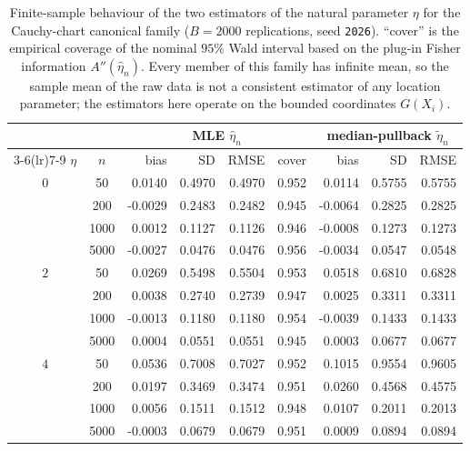 \documentclass[11pt]{article}
\theoremstyle{definition}
\begin{document}
\begin{table}[t]
\centering
\small
\begin{tabular}{cc rrrc rrr}
\toprule
& & \multicolumn{4}{c}{MLE $\hat\eta_n$}
  & \multicolumn{3}{c}{median-pullback $\tilde\eta_n$}\\
\cmidrule(lr){3-6}\cmidrule(lr){7-9}
$\eta$ & $n$ & bias & SD & RMSE & cover & bias & SD & RMSE\\
\midrule
$0$ & 50 & 0.0140 & 0.4970 & 0.4970 & 0.952 & 0.0114 & 0.5755 & 0.5755 \\
 & 200 & -0.0029 & 0.2483 & 0.2482 & 0.945 & -0.0064 & 0.2825 & 0.2825 \\
 & 1000 & 0.0012 & 0.1127 & 0.1126 & 0.946 & -0.0008 & 0.1273 & 0.1273 \\
 & 5000 & -0.0027 & 0.0476 & 0.0476 & 0.956 & -0.0034 & 0.0547 & 0.0548 \\
\addlinespace
$2$ & 50 & 0.0269 & 0.5498 & 0.5504 & 0.953 & 0.0518 & 0.6810 & 0.6828 \\
 & 200 & 0.0038 & 0.2740 & 0.2739 & 0.947 & 0.0025 & 0.3311 & 0.3311 \\
 & 1000 & -0.0013 & 0.1180 & 0.1180 & 0.954 & -0.0039 & 0.1433 & 0.1433 \\
 & 5000 & 0.0004 & 0.0551 & 0.0551 & 0.945 & 0.0003 & 0.0677 & 0.0677 \\
\addlinespace
$4$ & 50 & 0.0536 & 0.7008 & 0.7027 & 0.952 & 0.1015 & 0.9554 & 0.9605 \\
 & 200 & 0.0197 & 0.3469 & 0.3474 & 0.951 & 0.0260 & 0.4568 & 0.4575 \\
 & 1000 & 0.0056 & 0.1511 & 0.1512 & 0.948 & 0.0107 & 0.2011 & 0.2013 \\
 & 5000 & -0.0003 & 0.0679 & 0.0679 & 0.951 & 0.0009 & 0.0894 & 0.0894 \\
\bottomrule
\end{tabular}
\caption{Finite-sample behaviour of the two estimators of the natural
parameter $\eta$ for the Cauchy-chart canonical family
($B=2000$ replications, seed \texttt{2026}). ``cover'' is the empirical
coverage of the nominal $95\%$ Wald interval based on the plug-in Fisher
information $A''(\hat\eta_n)$. Every member of this family has infinite
mean, so the sample mean of the raw data is not a consistent estimator of
any location parameter; the estimators here operate on the bounded
coordinates $G(X_i)$.}
\label{tab:consistency}
\end{table}
\end{document}
